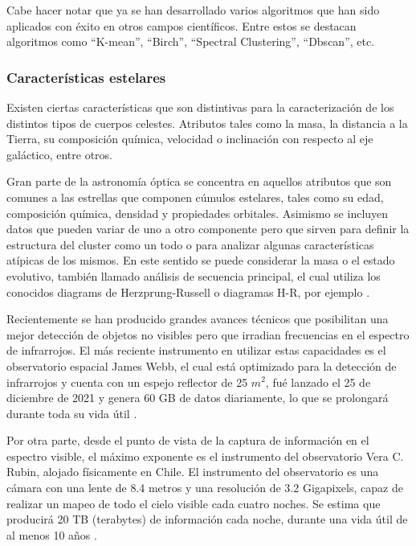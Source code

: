 \documentclass[
	11pt,oneside,a4paper,
	fleqn,
	article
]{memoir}
\begin{document}
Cabe hacer notar que ya se han desarrollado varios algoritmos que han sido aplicados con éxito en otros campos científicos. Entre estos se destacan algoritmos como “K-mean”, “Birch”, “Spectral Clustering”, “Dbscan”, etc. \parencite{rodriguez2019clustering}

\subsubsection{Características estelares}

Existen ciertas características que son distintivas para la caracterización de los distintos tipos de cuerpos celestes. Atributos tales como la masa, la distancia a la Tierra, su composición química, velocidad o inclinación con respecto al eje galáctico, entre otros. 

Gran parte de la astronomía óptica se concentra en aquellos atributos que son comunes a las estrellas que componen cúmulos estelares, tales como su edad, composición química, densidad y propiedades orbitales. Asimismo se incluyen datos que pueden variar de uno a otro componente pero que sirven para definir la estructura del cluster como un todo o para analizar algunas características atípicas de los mismos. En este sentido se puede considerar la masa o el estado evolutivo, también llamado análisis de secuencia principal, el cual utiliza los conocidos diagrams de Herzprung-Russell o diagramas H-R, por ejemplo \parencite{fall2012similarities,kalirai2010star}.

Recientemente se han producido grandes avances técnicos que posibilitan una mejor detección de objetos no visibles pero que irradian frecuencias en el espectro de infrarrojos. El más reciente instrumento en utilizar estas capacidades es el observatorio espacial James Webb, el cual está optimizado para la detección de infrarrojos y cuenta con un espejo reflector de 25 $m^2$, fué lanzado el 25 de diciembre de 2021 y genera 60 GB de datos diariamente, lo que se prolongará durante toda su vida útil \parencite{gardner2006james}.

Por otra parte, desde el punto de vista de la captura de información en el espectro visible, el máximo exponente es el instrumento del observatorio Vera C. Rubin, alojado físicamente en Chile. El instrumento del observatorio es una cámara con una lente de 8.4 metros y una resolución de 3.2 Gigapixels, capaz de realizar un mapeo de todo el cielo visible cada cuatro noches. Se estima que producirá 20 TB (terabytes) de información cada noche, durante una vida útil de al menos 10 años  \parencite{Telescope2021Jul}.
\end{document}
